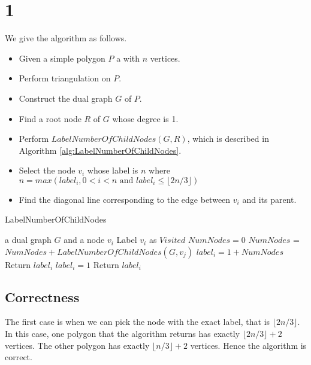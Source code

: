 
\section*{1}
We give the algorithm as follows. \\

\begin{itemize}
    \item Given a simple polygon $P$ a with $n$ vertices.
    \item Perform triangulation on $P$.
    \item Construct the dual graph $G$ of $P$.
    \item Find a root node $R$ of $G$ whose degree is 1.
    \item Perform $LabelNumberOfChildNodes(G,R)$, which is described in  Algorithm \ref{alg:LabelNumberOfChildNodes}.
    \item Select the node $v_i$ whose label is $n$ where $n = max(label_i,0<i<n \text{ and } label_i \leq \lfloor 2n/3\rfloor )$
    \item Find the diagonal line corresponding to the edge between $v_i$ and its parent.
\end{itemize}

\begin{algorithm}[h]
  \caption{LabelNumberOfChildNodes}
  \label{alg:LabelNumberOfChildNodes}
  \begin{algorithmic}
      \Require a dual graph $G$ and a node $v_i$
      \State Label $v_i$ as $Visited$
      \State $NumNodes = 0$
      \State $NumNodes$ = $NumNodes + LabelNumberOfChildNodes(G, v_j)$
      \EndIf
      \EndFor
      \State $label_i = 1 + NumNodes$
      \State Return $label_i$
      \Else
      \State $label_i = 1$
      \State Return $label_i$
      \EndIf
\end{algorithmic}
\end{algorithm}

\subsection*{Correctness}
The first case is when we can pick the node with the exact label, that is $\lfloor2n/3\rfloor$.
In this case, one polygon that the algorithm returns has exactly $\lfloor2n/3\rfloor + 2$ vertices. 
The other polygon has exactly $\lfloor n/3\rfloor + 2$ vertices.
Hence the algorithm is correct. \\

